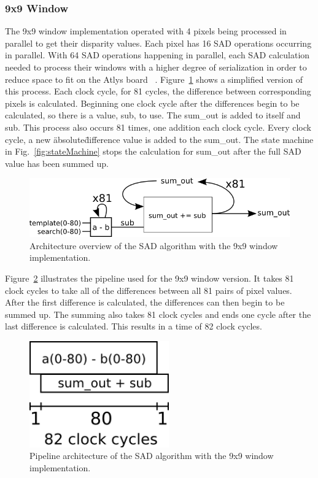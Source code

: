 \subsubsection{9x9 Window}
\label{sec:9x9window}

The 9x9 window implementation operated with 4 pixels being processed in parallel to get their disparity values. Each pixel has 16 SAD operations occurring in parallel. With 64 SAD operations happening in parallel, each SAD calculation needed to process their windows with a higher degree of serialization in order to reduce space to fit on the Atlys board ~\cite{atlysBoard}. Figure~\ref{fig:sadAlg9x9} shows a simplified version of this process. Each clock cycle, for 81 cycles, the difference between corresponding pixels is calculated. Beginning one clock cycle after the differences begin to be calculated, so there is a value, sub, to use. The sum\_out is added to itself and sub. This process also occurs 81 times, one addition each clock cycle. Every clock cycle, a new \"absolute\" difference value is added to the sum\_out. The state machine in Fig.~\ref{fig:stateMachine} stops the calculation for sum\_out after the full SAD value has been summed up.

\begin{figure}[h]
	\begin{center}
		\includegraphics[width=120mm]{figures/sadAlgorithm9x9.png}
		\captionfonts
		\caption{Architecture overview of the SAD algorithm with the 9x9 window implementation.}
		\label{fig:sadAlg9x9}
	\end{center}
\end{figure}

Figure~\ref{fig:sadPipe9x9} illustrates the pipeline used for the 9x9 window version. It takes 81 clock cycles to take all of the differences between all 81 pairs of pixel values. After the first difference is calculated, the differences can then begin to be summed up. The summing also takes 81 clock cycles and ends one cycle after the last difference is calculated. This results in a time of 82 clock cycles.

\begin{figure}[h]
	\begin{center}
		\includegraphics[width=60mm]{figures/sadPipeline9x9.png}
		\captionfonts
		\caption{Pipeline architecture of the SAD algorithm with the 9x9 window implementation.}
		\label{fig:sadPipe9x9}
	\end{center}
\end{figure}


